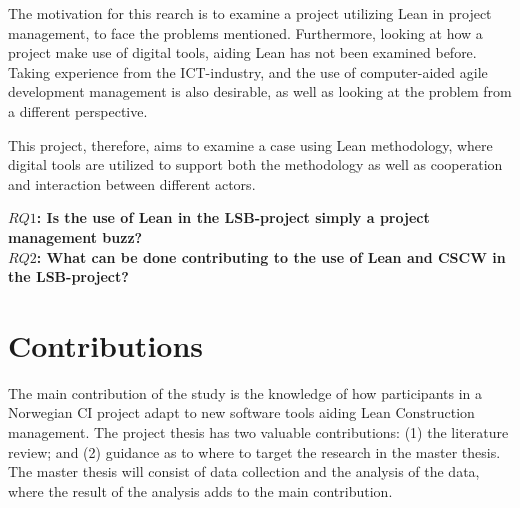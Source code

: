 The motivation for this rearch is to examine a project utilizing Lean in project management, to face the problems mentioned. Furthermore, looking at how a project make use of digital tools, aiding Lean has not been examined before. Taking experience from the ICT-industry, and the use of computer-aided agile development management is also desirable, as well as looking at the problem from a different perspective.

This project, therefore, aims to examine a case using Lean methodology, where digital tools are utilized to support both the methodology as well as cooperation and interaction between different actors.

{\noindent \bf $RQ1$: Is the use of Lean in the LSB-project simply a project management buzz?} \\
{\bf $RQ2$: What can be done contributing to the use of Lean and CSCW in the LSB-project?}

\section{Contributions}



The main contribution of the study is the knowledge of how participants in a Norwegian CI project adapt to new software tools aiding Lean Construction management. The project thesis has two valuable contributions: (1) the literature review; and (2) guidance as to where to target the research in the master thesis. The master thesis will consist of data collection and the analysis of the data, where the result of the analysis adds to the main contribution. 

